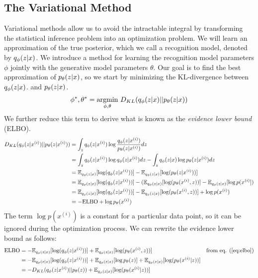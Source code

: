 \documentclass{article}
\begin{document}
\subsection{The Variational Method}
Variational methods allow us to avoid the intractable integral by transforming the statistical inference problem into an optimization problem. We will learn an approximation of the true posterior, which we call a recognition model, denoted by $q_\phi(z|x)$. We introduce a method for learning the recognition model parameters $\phi$ jointly with the generative model parameters $\theta$. Our goal is to find the best approximation of $p_\theta(z|x)$, so we start by minimizing the KL-divergence between $q_\phi(z|x)$. and $p_\theta(z|x)$.\\
\begin{align}
    \phi^*,\theta^* = \underset{\phi,\theta}{\mathrm{argmin}} ~D_{KL}(q_\phi(z|x)||p_\theta(z|x))
\end{align}
We further reduce this term to derive what is known as the \textit{evidence lower bound} (ELBO).
\begin{align}
    D_{KL}(q_\phi(z|x^{(i)})||p_\theta(z|x^{(i)})) &= \int_z q_\phi(z|x^{(i)})\log{\frac{q_\phi(z|x^{(i)})}{p_\theta(z|x^{(i)})}}dz \\
    &= \int_z q_\phi(z|x^{(i)})\log{q_\phi(z|x^{(i)})}dz - \int_z q_\phi(z|x)\log{p_\theta(z|x^{(i)})}dz \\
    &= \mathbb{E}_{q_\phi(z|x)}[\log (q_\phi(z|x^{(i)}))] - \mathbb{E}_{q_\phi(z|x)}[\log (p_\theta(z|x^{(i)}))] \\
    &= \mathbb{E}_{q_\phi(z|x)}[\log (q_\phi(z|x^{(i)}))] - (\mathbb{E}_{q_\phi(z|x)}[\log (p_\theta(x^{(i)},z))] - \mathbb{E}_{q_\phi(z|x)}[\log p(x^{(i)}]) \\
    &= \mathbb{E}_{q_\phi(z|x)}[\log (q_\phi(z|x^{(i)}))] - \mathbb{E}_{q_\phi(z|x)}[\log (p_\theta(x^{(i)},z))] + \log p(x^{(i)}) \label{eq:elbo}\\
    &= -\text{ELBO} + \log p_\theta(x^{(i)})\label{eq:likelihood}
\end{align}
The term $\log p(x^{(i)})$ is a constant for a particular data point, so it can be ignored during the optimization process. We can rewrite the evidence lower bound as follows:
\begin{align}
    \text{ELBO} &= -\mathbb{E}_{q_\phi(z|x)}[\log (q_\phi(z|x^{(i)}))] + \mathbb{E}_{q_\phi(z|x)}[\log (p_\theta(x^{(i)},z))]  \label{eq:elbo1}&\text{from eq. (\ref{eq:elbo})}\\
    &= -\mathbb{E}_{q_\phi(z|x)}[\log (q_\phi(z|x^{(i)}))] + \mathbb{E}_{q_\phi(z|x)}[\log p_{\theta}(z)] + \mathbb{E}_{q_\phi(z|x)}[\log (p_\theta(x^{(i)}|z))] \\
    &= -D_{KL}(q_\phi(z|x^{(i)})||p_\theta(z)) + \mathbb{E}_{q_\phi(z|x)}[\log (p_\theta(x^{(i)}|z))] \label{eq:elbo_simplified}
\end{align}
\end{document}
